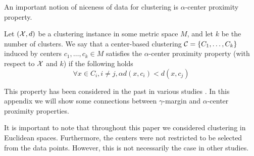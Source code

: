 
An important notion of niceness of data for clustering is $\alpha$-center proximity property.

\begin{definition}
\label{defn:alphacp}
Let $(\mathcal X, d)$ be a clustering instance in some metric space $M$, and let $k$ be the number of clusters. We say that a center-based clustering $\mathcal C = \{C_1, \ldots, C_k\}$ induced by centers $c_1, \ldots, c_k \in M$ satisfies the $\alpha$-center proximity property (with respect to  $\mathcal X$ and $k$) if the following holds 
$$\forall x \in C_i, i\neq j, \alpha d(x, c_i) < d(x, c_j)$$
\end{definition}


 This property has been considered in the past in various studies \cite{balcan2012clustering,awasthi2012center}. In this appendix we will show some connections between $\gamma$-margin and $\alpha$-center proximity properties.
 
 
  It is important to note that throughout this paper we considered clustering in Euclidean spaces. Furthermore, the centers were not restricted to be selected from the data points. 
  However, this is not necessarily the case in other studies.





